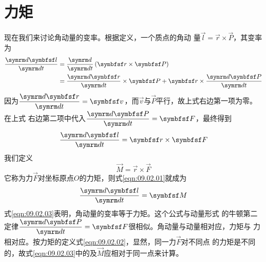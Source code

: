 \section[力矩]{力\hspace{3em}矩}\label{sec:09.02}

现在我们来讨论角动量的变率。根据定义，一个质点的角动
量$ \vec{l} = \vec{r} \times \vec{P} $，其变率为
\\
\begin{equation*}
  \begin{split}
    \frac { \dif \vec{l} } { \dif t } &= \frac { \dif } { \dif t } \left( \vec{r} \times \vec{P} \right) \\
    &= \frac { \dif \vec{r} } { \dif t } \times \vec{P} + \vec{r} \times \frac { \dif \vec{P} } { \dif t }
  \end{split}
\end{equation*}
因为$ \dfrac { \dif \vec{r} } { \dif t } = \vec{v} $，而$\vec{v}$与$\vec{P}$平行，故上式右边第一项为零。在上式
右边第二项中代入$\dfrac { \dif \vec{P} } { \dif t } = \vec{F}$，最终得到
\begin{equation}\label{eqn:09.02.01}
  \frac { \dif \vec{l} } { \dif t } = \vec{r} \times \vec{F}
\end{equation}
我们定义
\begin{equation}\label{eqn:09.02.02}
  \vec{M} = \vec{r} \times \vec{F}
\end{equation}
它称为力$\vec{F}$对坐标原点$O$的力矩，则式\eqref{eqn:09.02.01}就成为
\begin{equation}\label{eqn:09.02.03}
  \frac { \dif \vec{l} } { \dif t } = \vec{M}
\end{equation}
式\eqref{eqn:09.02.03}表明，角动量的变率等于力矩。这个公式与动量形式
的牛顿第二定律$ \dfrac { \dif \vec{P} } { \dif t } = \vec{F} $很相似。角动量与动量相对应，力矩与
力相对应。按力矩的定义\lhbrak 式\eqref{eqn:09.02.02}\rhbrak ，显然，同一力$\vec{F}$对不同点
的力矩是不同的，故式\eqref{eqn:09.02.03}中的及$\vec{M}$应相对于同一点来计算。

